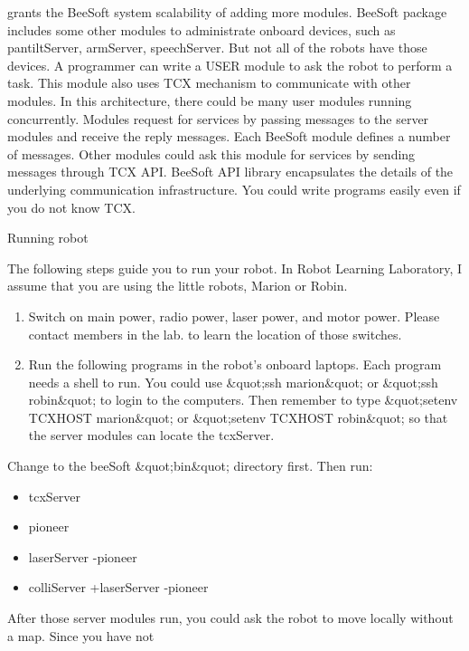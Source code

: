 grants the BeeSoft system scalability of adding more modules. BeeSoft
package includes some other modules to administrate onboard devices,
such as pantiltServer, armServer, speechServer. But not all of the
robots have those devices. A programmer can write a USER module to ask
the robot to perform a task. This module also uses TCX mechanism to
communicate with other modules. In this architecture, there could be
many user modules running concurrently. Modules request for services
by passing messages to the server modules and receive the reply
messages. Each BeeSoft module defines a number of messages. Other
modules could ask this module for services by sending messages through
TCX API. BeeSoft API library encapsulates the details of the
underlying communication infrastructure. You could write programs
easily even if you do not know TCX.\par \par Running robot\par \par
The following steps guide you to run your robot. In Robot Learning
Laboratory, I assume that you are using the little robots, Marion or
Robin. \par \begin{enumerate}\item Switch on main power, radio power,
  laser power, and motor power. Please contact members in the lab. to
  learn the location of those switches.  \item Run the following
  programs in the robot's onboard laptops. Each program needs a shell
  to run. You could use \&quot;ssh marion\&quot; or \&quot;ssh
  robin\&quot; to login to the computers. Then remember to type
  \&quot;setenv TCXHOST marion\&quot; or \&quot;setenv TCXHOST
  robin\&quot; so that the server modules can locate the tcxServer.
  \end{enumerate}\par Change to the beeSoft \&quot;bin\&quot;
directory first. Then run:\par \begin{itemize}\item tcxServer 
\item pioneer 
\item laserServer -pioneer 
\item colliServer +laserServer
  -pioneer \end{itemize}\par After those server modules run, you
could ask the robot to move locally without a map. Since you have not
